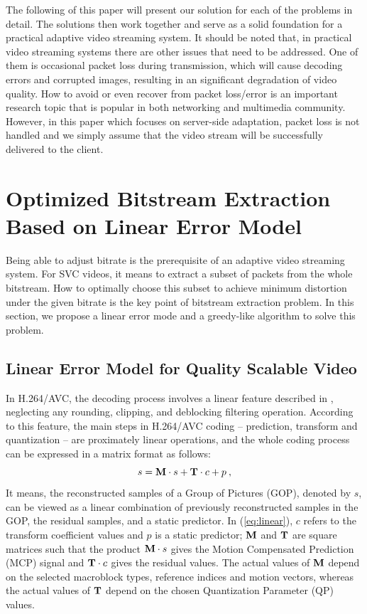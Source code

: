 \documentclass[journal]{IEEEtran}
\begin{document}
The following of this paper will present our solution for each of the problems in detail. The solutions then work together and serve as a solid foundation for a practical adaptive video streaming system. It should be noted that, in practical video streaming systems there are other issues that need to be addressed. One of them is occasional packet loss during transmission, which will cause decoding errors and corrupted images, resulting in an significant degradation of video quality. How to avoid or even recover from packet loss/error is an important research topic that is popular in both networking and multimedia community. However, in this paper which focuses on server-side adaptation, packet loss is not handled and we simply assume that the video stream will be successfully delivered to the client.

\section{Optimized Bitstream Extraction Based on Linear Error Model}
\label{sec:bitstream-extraction}

Being able to adjust bitrate is the prerequisite of an adaptive video streaming system. For SVC videos, it means to extract a subset of packets from the whole bitstream. How to optimally choose this subset to achieve minimum distortion under the given bitrate is the key point of bitstream extraction problem. In this section, we propose a linear error mode and a greedy-like algorithm to solve this problem.

\subsection{Linear Error Model for Quality Scalable Video}
\label{subsec:linear-model}

In H.264/AVC, the decoding process involves a linear feature described in \cite{Winken08}, neglecting any rounding, clipping, and deblocking filtering operation. According to this feature, the main steps in H.264/AVC coding -- prediction, transform and quantization -- are proximately linear operations, and the whole coding process can be expressed in a matrix format as follows:
\begin{equation}
\label{eq:linear}
s = {\rm\bf M} \cdot s + {\rm\bf T} \cdot c + p \: ,
\end{equation}
It means, the reconstructed samples of a Group of Pictures (GOP), denoted by $s$, can be viewed as a linear combination of previously reconstructed samples in the GOP, the residual samples, and a static predictor. In (\ref{eq:linear}), $c$ refers to the transform coefficient values and $p$ is a static predictor; ${\rm\bf M}$ and ${\rm\bf T}$ are square matrices such that the product ${\rm\bf M} \cdot s$ gives the Motion Compensated Prediction (MCP) signal and ${\rm\bf T} \cdot c$ gives the residual values. The actual values of ${\rm\bf M}$ depend on the selected macroblock types, reference indices and motion vectors, whereas the actual values of ${\rm\bf T}$ depend on the chosen Quantization Parameter (QP) values.
\end{document}
